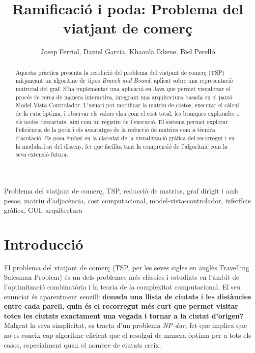 \documentclass{ieeetj}
\begin{document}

\title{Ramificació i poda: Problema del viatjant de comerç}

\author{Josep Ferriol, Daniel García, Khaoula Ikkene, Biel Perelló}  



\begin{abstract}
Aquesta pràctica presenta la resolució del problema del viatjant de comerç (TSP)\cite{TSP} mitjançant un algoritme de tipus \textit{Branch and Bound}, aplicat sobre una representació matricial del graf. S'ha implementat una aplicació en Java que permet visualitzar el procés de cerca de manera interactiva, integrant una arquitectura basada en el patró Model-Vista-Controlador. L'usuari pot modificar la matriu de costos, executar el càlcul de la ruta òptima, i observar els valors clau com el cost total, les branques explorades o els nodes descartats, així com un registre de l'execució. El sistema permet explorar l'eficiència de la poda i els avantatges de la reducció de matrius com a tècnica d'acotació. Es posa èmfasi en la claredat de la visualització gràfica del recorregut i en la modularitat del disseny, fet que facilita tant la comprensió de l’algoritme com la seva extensió futura.
\end{abstract}


\begin{IEEEkeywords}
Problema del viatjant de comerç, TSP, reducció de matrius, graf dirigit i amb pesos, matriu d'adjacència, cost computacional, model-vista-controlador, inferfície gràfica, GUI, arquitectura
\end{IEEEkeywords}


\maketitle


\section{Introducció}
El problema del viatjant de comerç (TSP, per les seves sigles en anglès Travelling Salesman Problem)\cite{TSP} és un dels problemes més clàssics i estudiats en l'àmbit de l'optimització combinatòria i la teoria de la complexitat computacional. El seu enunciat és aparentment senzill:\textbf{ donada una llista de ciutats i les distàncies entre cada parell, quin és el recorregut més curt que permet visitar totes les ciutats exactament una vegada i tornar a la ciutat d’origen?} Malgrat la seva simplicitat, es tracta d’un problema \textit{NP-dur\cite{NP-hard}}, fet que implica que no es coneix cap algoritme eficient que el resolgui de manera òptima per a tots els casos, especialment quan el nombre de ciutats creix.\newline
\end{document}
